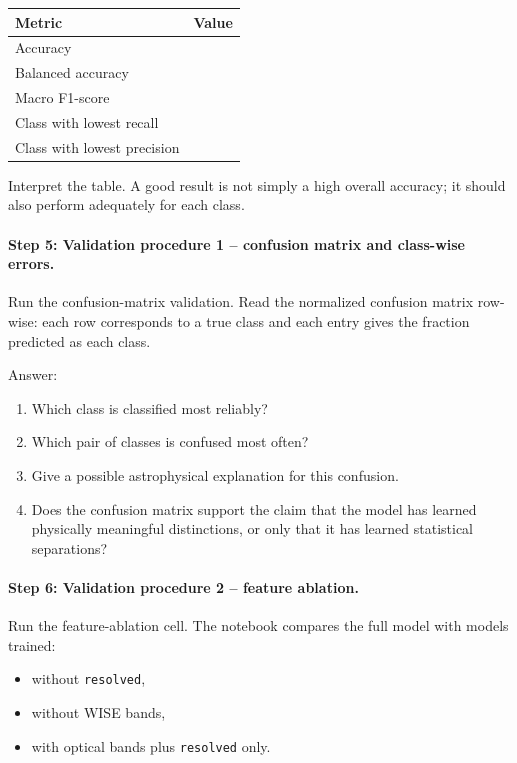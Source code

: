 \documentclass[11pt]{article}
\begin{document}
\begin{center}
\begin{tabular}{l l}
\hline
Metric & Value \\
\hline
Accuracy & \\
Balanced accuracy & \\
Macro F1-score & \\
Class with lowest recall & \\
Class with lowest precision & \\
\hline
\end{tabular}
\end{center}

Interpret the table. A good result is not simply a high overall accuracy; it should also perform adequately for each class.

\paragraph{Step 5: Validation procedure 1 -- confusion matrix and class-wise errors.}
Run the confusion-matrix validation. Read the normalized confusion matrix row-wise: each row corresponds to a true class and each entry gives the fraction predicted as each class.

Answer:
\begin{enumerate}
    \item Which class is classified most reliably?
    \item Which pair of classes is confused most often?
    \item Give a possible astrophysical explanation for this confusion.
    \item Does the confusion matrix support the claim that the model has learned physically meaningful distinctions, or only that it has learned statistical separations?
\end{enumerate}

\paragraph{Step 6: Validation procedure 2 -- feature ablation.}
Run the feature-ablation cell. The notebook compares the full model with models trained:
\begin{itemize}
    \item without \texttt{resolved},
    \item without WISE bands,
    \item with optical bands plus \texttt{resolved} only.
\end{itemize}
\end{document}
